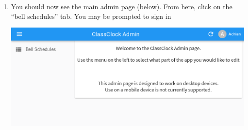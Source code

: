 \documentclass{article}
\begin{document}
\begin{enumerate}
\item {You should now see the main admin page (below). From here, click on the “bell schedules” tab. You may be prompted to
sign in}
\begin{center}
\includegraphics[width=\textwidth]{Mini20Manual-img004.png}
\end{center}
\end{enumerate}
\end{document}
